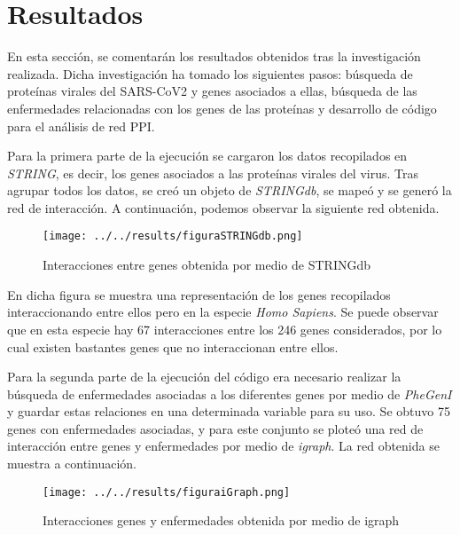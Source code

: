 \section{Resultados}

En esta sección, se comentarán los resultados obtenidos tras la investigación realizada. Dicha investigación ha tomado los siguientes pasos: búsqueda de proteínas virales del SARS-CoV2 y genes asociados a ellas, búsqueda de las enfermedades relacionadas con los genes de las proteínas y desarrollo de código para el análisis de red PPI.

\newline

Para la primera parte de la ejecución se cargaron los datos recopilados en \textit{STRING}, es decir, los genes asociados a las proteínas virales del virus. Tras agrupar todos los datos, se creó un objeto de \textit{STRINGdb}, se mapeó y se generó la red de interacción. A continuación, podemos observar la siguiente red obtenida.

\newline

\begin{figure}[h!]
	\texttt{[image: ../../results/figuraSTRINGdb.png]}
	\caption{Interacciones entre genes obtenida por medio de STRINGdb}
	\label{fig:red_stringdb}
\end{figure}

\newline

En dicha figura se muestra una representación de los genes recopilados interaccionando entre ellos pero en la especie \textit{Homo Sapiens}. Se puede observar que en esta especie hay 67 interacciones entre los 246 genes considerados, por lo cual existen bastantes genes que no interaccionan entre ellos.

\newline

Para la segunda parte de la ejecución del código era necesario realizar la búsqueda de enfermedades asociadas a los diferentes genes por medio de \textit{PheGenI} y guardar estas relaciones en una determinada variable para su uso. Se obtuvo 75 genes con enfermedades asociadas, y para este conjunto se ploteó una red de interacción entre genes y enfermedades por medio de \textit{igraph}. La red obtenida se muestra a continuación.

\newline

\begin{figure}[h!]
	\texttt{[image: ../../results/figuraiGraph.png]}
	\caption{Interacciones genes y enfermedades obtenida por medio de igraph}
	\label{fig:red_igraph}
\end{figure}

